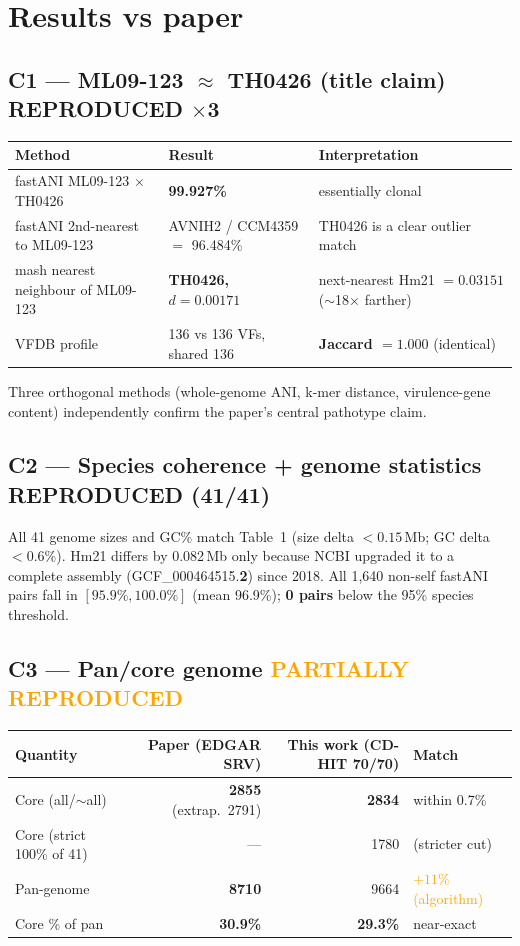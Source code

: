 \documentclass[11pt]{article}
\begin{document}
\section{Results vs paper}

\subsection*{C1 --- ML09-123 $\approx$ TH0426 (title claim) \textcolor{green!60!black}{REPRODUCED $\times$3}}
\begin{tabular}{lll}
\toprule
Method & Result & Interpretation \\
\midrule
fastANI ML09-123 $\times$ TH0426 & \textbf{99.927\%} & essentially clonal \\
fastANI 2nd-nearest to ML09-123 & AVNIH2 / CCM4359 $=$ 96.484\% & TH0426 is a clear outlier match \\
mash nearest neighbour of ML09-123 & \textbf{TH0426, $d = 0.00171$} & next-nearest Hm21 $= 0.03151$ ($\sim$18$\times$ farther) \\
VFDB profile & 136 vs 136 VFs, shared 136 & \textbf{Jaccard $= 1.000$} (identical) \\
\bottomrule
\end{tabular}

Three orthogonal methods (whole-genome ANI, k-mer distance, virulence-gene content)
independently confirm the paper's central pathotype claim.

\subsection*{C2 --- Species coherence + genome statistics \textcolor{green!60!black}{REPRODUCED (41/41)}}
All 41 genome sizes and GC\% match Table~1 (size delta $< 0.15$\,Mb; GC delta $< 0.6$\%).
Hm21 differs by 0.082\,Mb only because NCBI upgraded it to a complete assembly
(GCF\_000464515.\textbf{2}) since 2018. All 1{,}640 non-self fastANI pairs fall in
$[95.9\%, 100.0\%]$ (mean 96.9\%); \textbf{0 pairs} below the 95\% species threshold.

\subsection*{C3 --- Pan/core genome \textcolor{orange}{PARTIALLY REPRODUCED}}
\begin{tabular}{lrrl}
\toprule
Quantity & Paper (EDGAR SRV) & This work (CD-HIT 70/70) & Match \\
\midrule
Core (all/$\sim$all) & \textbf{2855} (extrap.\ 2791) & \textbf{2834} & \textcolor{green!60!black}{within 0.7\%} \\
Core (strict 100\% of 41) & --- & 1780 & (stricter cut) \\
Pan-genome & \textbf{8710} & 9664 & \textcolor{orange}{$+11\%$ (algorithm)} \\
Core \% of pan & \textbf{30.9\%} & \textbf{29.3\%} & \textcolor{green!60!black}{near-exact} \\
\bottomrule
\end{tabular}
\end{document}
